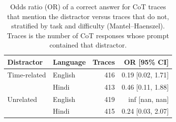\begin{table}[ht]
\centering
\small
\begin{tabular}{llrr}
\toprule
Distractor & Language & Traces & OR [95\% CI] \\
\midrule
Time-related & English & 416 & 0.19 [0.02, 1.71] \\
 & Hindi & 413 & 0.46 [0.11, 1.88] \\
\midrule
Unrelated & English & 419 & inf [nan, nan] \\
 & Hindi & 415 & 0.24 [0.03, 2.07] \\
\bottomrule
\end{tabular}
\caption{Odds ratio (OR) of a correct answer for CoT traces that mention the distractor versus traces that do not, stratified by task and difficulty (Mantel--Haenszel). Traces is the number of CoT responses whose prompt contained that distractor.}
\label{tab:mention-or}
\end{table}
